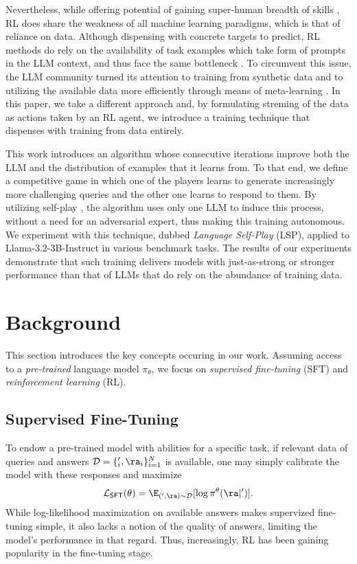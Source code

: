 \documentclass[]{fairmeta}
\begin{document}
Nevertheless, while offering potential of gaining super-human breadth of skills \citep{silver2025welcome}, RL does share the weakness of all machine learning paradigms, which is that of reliance on data.
Although dispensing with concrete targets to predict, RL methods do rely on the availability of task examples which take form of prompts in the LLM context, and thus face the same bottleneck \citep{villalobos2022will, jones2024ai}.
To circumvent this issue, the LLM community turned its attention to training from synthetic data \citep{patel2024datadreamer, setlur2024rl} and to utilizing the available data more efficiently through means of meta-learning \citep{zweiger2025self, calian2025datarater}.
In this paper, we take a different approach and, by formulating streming of the data as actions taken by an RL agent, we introduce a training technique that dispenses with training from data entirely.

This work introduces an algorithm whose consecutive iterations improve both the LLM and the distribution of examples that it learns from.
To that end, we define a competitive game in which one of the players learns to generate increasingly more challenging queries and the other one learns to respond to them.
By utilizing self-play \citep{silver2017mastering, bai2020provable, openai2021asymmetric, mcaleer2022self}, the algorithm uses only one LLM to induce this process, without a need for an adversarial expert, thus making this training autonomous.
We experiment with this technique, dubbed \emph{Language Self-Play} (LSP), applied to Llama-3.2-3B-Instruct \citep{dubey2024llama, meta2024llama32instruct} in various benchmark tasks. The results of our experiments demonstrate that such training delivers models with just-as-strong or stronger performance than that of LLMs that do rely on the abundance of training data.

\section{Background}
This section introduces the key concepts occuring in our work.
Assuming access to a \emph{pre-trained} language model $\pi_{\theta}$, we focus on \emph{supervised fine-tuning} (SFT) and \emph{reinforcement learning} (RL).

\subsection{Supervised Fine-Tuning}
To endow a pre-trained model with abilities for a specific task, if relevant data of queries and answers $\mathcal{D}=\{\rq_i, \ra_i\}_{i=1}^{N}$ is available, one may simply calibrate the model with these responses and maximize
\begin{align}
    \mathcal{L}_{\mathsf{SFT}}(\theta) = \E_{(\rq, \ra)\sim \mathcal{D}}[\log\pi^{\theta}(\ra|\rq)]. \nonumber
\end{align}
While log-likelihood maximization on available answers makes supervized fine-tuning \citep[SFT]{wei2021finetuned, chung2024scaling} simple, it also lacks a notion of the quality of answers, limiting the model's performance in that regard. 
Thus, increasingly, RL has been gaining popularity in the fine-tuning stage.
\end{document}
